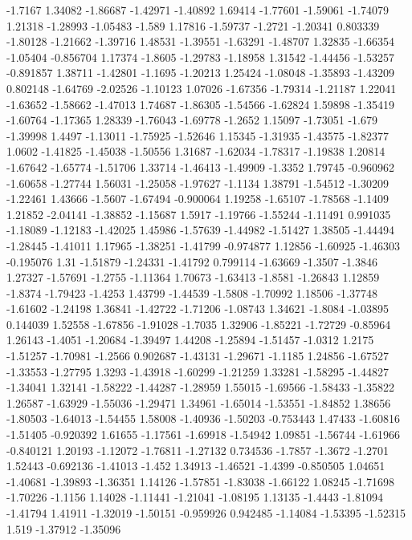 \documentclass[9pt]{article}
\theoremstyle{plain}
\theoremstyle{definition}
\theoremstyle{remark}
\numberwithin{equation}{section}
\begin{document}
-1.7167
1.34082
-1.86687
-1.42971
-1.40892
1.69414
-1.77601
-1.59061
-1.74079
1.21318
-1.28993
-1.05483
-1.589
1.17816
-1.59737
-1.2721
-1.20341
0.803339
-1.80128
-1.21662
-1.39716
1.48531
-1.39551
-1.63291
-1.48707
1.32835
-1.66354
-1.05404
-0.856704
1.17374
-1.8605
-1.29783
-1.18958
1.31542
-1.44456
-1.53257
-0.891857
1.38711
-1.42801
-1.1695
-1.20213
1.25424
-1.08048
-1.35893
-1.43209
0.802148
-1.64769
-2.02526
-1.10123
1.07026
-1.67356
-1.79314
-1.21187
1.22041
-1.63652
-1.58662
-1.47013
1.74687
-1.86305
-1.54566
-1.62824
1.59898
-1.35419
-1.60764
-1.17365
1.28339
-1.76043
-1.69778
-1.2652
1.15097
-1.73051
-1.679
-1.39998
1.4497
-1.13011
-1.75925
-1.52646
1.15345
-1.31935
-1.43575
-1.82377
1.0602
-1.41825
-1.45038
-1.50556
1.31687
-1.62034
-1.78317
-1.19838
1.20814
-1.67642
-1.65774
-1.51706
1.33714
-1.46413
-1.49909
-1.3352
1.79745
-0.960962
-1.60658
-1.27744
1.56031
-1.25058
-1.97627
-1.1134
1.38791
-1.54512
-1.30209
-1.22461
1.43666
-1.5607
-1.67494
-0.900064
1.19258
-1.65107
-1.78568
-1.1409
1.21852
-2.04141
-1.38852
-1.15687
1.5917
-1.19766
-1.55244
-1.11491
0.991035
-1.18089
-1.12183
-1.42025
1.45986
-1.57639
-1.44982
-1.51427
1.38505
-1.44494
-1.28445
-1.41011
1.17965
-1.38251
-1.41799
-0.974877
1.12856
-1.60925
-1.46303
-0.195076
1.31
-1.51879
-1.24331
-1.41792
0.799114
-1.63669
-1.3507
-1.3846
1.27327
-1.57691
-1.2755
-1.11364
1.70673
-1.63413
-1.8581
-1.26843
1.12859
-1.8374
-1.79423
-1.4253
1.43799
-1.44539
-1.5808
-1.70992
1.18506
-1.37748
-1.61602
-1.24198
1.36841
-1.42722
-1.71206
-1.08743
1.34621
-1.8084
-1.03895
0.144039
1.52558
-1.67856
-1.91028
-1.7035
1.32906
-1.85221
-1.72729
-0.85964
1.26143
-1.4051
-1.20684
-1.39497
1.44208
-1.25894
-1.51457
-1.0312
1.2175
-1.51257
-1.70981
-1.2566
0.902687
-1.43131
-1.29671
-1.1185
1.24856
-1.67527
-1.33553
-1.27795
1.3293
-1.43918
-1.60299
-1.21259
1.33281
-1.58295
-1.44827
-1.34041
1.32141
-1.58222
-1.44287
-1.28959
1.55015
-1.69566
-1.58433
-1.35822
1.26587
-1.63929
-1.55036
-1.29471
1.34961
-1.65014
-1.53551
-1.84852
1.38656
-1.80503
-1.64013
-1.54455
1.58008
-1.40936
-1.50203
-0.753443
1.47433
-1.60816
-1.51405
-0.920392
1.61655
-1.17561
-1.69918
-1.54942
1.09851
-1.56744
-1.61966
-0.840121
1.20193
-1.12072
-1.76811
-1.27132
0.734536
-1.7857
-1.3672
-1.2701
1.52443
-0.692136
-1.41013
-1.452
1.34913
-1.46521
-1.4399
-0.850505
1.04651
-1.40681
-1.39893
-1.36351
1.14126
-1.57851
-1.83038
-1.66122
1.08245
-1.71698
-1.70226
-1.1156
1.14028
-1.11441
-1.21041
-1.08195
1.13135
-1.4443
-1.81094
-1.41794
1.41911
-1.32019
-1.50151
-0.959926
0.942485
-1.14084
-1.53395
-1.52315
1.519
-1.37912
-1.35096
\end{document}
